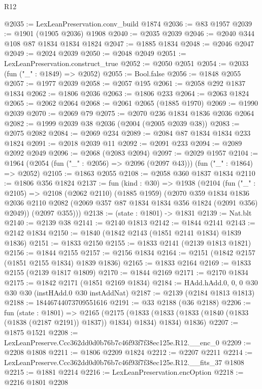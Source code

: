 \begin{lexlean}{R12}
\begin{coremodule}
@2035 := LexLeanPreservation.conv_build @1874
@2036 := @83 @1957
@2039 := @1901 (@1905 @2036) @1908
@2040 := @2035 @2039
@2046 := @2040 @344 @108 @87 @1834 @1834 @1824
@2047 := @1885 @1834
@2048 := @2046 @2047
@2049 := @2024 @2039
@2050 := @2048 @2049
@2051 := LexLeanPreservation.construct_true
@2052 := @2050 @2051
@2054 := @2033 (fun ("_" : @1849) => @2052)
@2055 := Bool.false
@2056 := @1848 @2055
@2057 := @1977 @2039
@2058 := @2057 @195
@2061 := @2058 @292 @1837 @1834
@2062 := @1806 @2036
@2063 := @1806 @233
@2064 := @2063 @1824
@2065 := @2062 @2064
@2068 := @2061 @2065 (@1885 @1970)
@2069 := @1990 @2039
@2070 := @2069 @79
@2075 := @2070 @236 @1834 @1836 @2036 @2064
@2082 := @1999 @2039 @38 @2036 (@2004 (@2005 @2039 @38))
@2083 := @2075 @2082
@2084 := @2069 @234
@2089 := @2084 @87 @1834 @1834 @233 @1824
@2091 := @2018 @2039 @11
@2092 := @2091 @233
@2094 := @2089 @2092 @2049
@2096 := @2068 (@2083 @2094)
@2097 := @2029 @1957
@2104 := @1964 (@2054 (fun ("_" : @2056) => @2096 (@2097 @43))) (fun ("_" : @1864) => @2052)
@2105 := @1863 @2055
@2108 := @2058 @360 @1837 @1834
@2110 := @1806 @356 @1824
@2137 := fun (kind : @30) =>
  @1938
    (@2104
      (fun ("_" : @2105) =>
      @2108
        (@2062 @2110)
        (@1885 @1959)
        (@2070
          @359
          @1834
          @1836
          @2036
          @2110
          @2082
          (@2069 @357 @87 @1834 @1834 @356 @1824 (@2091 @356) @2049))
        (@2097 @355)))
@2138 := (state : @1801) -> @1831
@2139 := Nat.blt
@2140 := @2139 @38
@2141 := @2140 @1813
@2142 := @1844 @2141
@2143 := @2142 @1834
@2150 := @1840 (@1842 @2143 (@1851 @2141 @1834) @1839 @1836)
@2151 := @1833 @2150
@2155 := @1833 @2141 (@2139 @1813 @1821)
@2156 := @1844 @2155
@2157 := @2156 @1834
@2164 := @2151 (@1842 @2157 (@1851 @2155 @1834) @1839 @1836)
@2165 := @1833 @2164
@2169 := @1833 @2155 (@2139 @1817 @1809)
@2170 := @1844 @2169
@2171 := @2170 @1834
@2175 := @1842 @2171 (@1851 @2169 @1834)
@2184 := HAdd.hAdd.{0, 0, 0} @30 @30 @30 (instHAdd.{0} @30 instAddNat)
@2187 := @2139 (@2184 @1813 @1813)
@2188 := 18446744073709551616
@2191 := @33 @2188 (@36 @2188)
@2206 := fun (state : @1801) =>
  @2165
    (@2175
      (@1833 (@1833 (@1833 (@1840 (@1833 (@1838 (@2187 @2191)) @1837)) @1834) @1834) @1834)
      @1836)
@2207 := @1875 @1521
@2208 := LexLeanPreserve.Ccc362dd0d0b76b7c46f93f7f38ec125e.R12.__enc_0
@2209 := @2208 @1808
@2211 := @1806 @2209 @1824
@2212 := @2207 @2211
@2214 := LexLeanPreserve.Ccc362dd0d0b76b7c46f93f7f38ec125e.R12.__fits_37 @1808
@2215 := @1881 @2214
@2216 := LexLeanPreservation.encOption
@2218 := @2216 @1801 @2208

\end{coremodule}
\end{lexlean}
